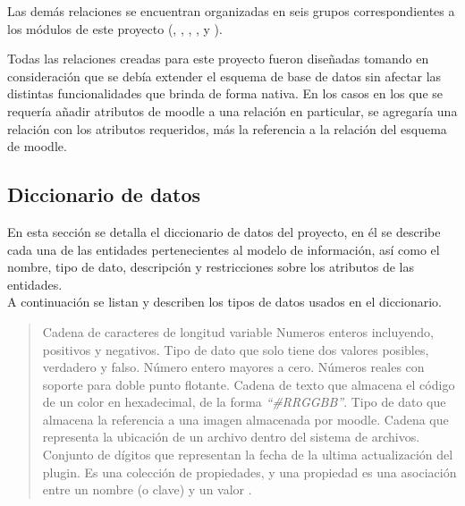  \noindent Las demás relaciones se encuentran organizadas en seis grupos correspondientes
 a los módulos de este proyecto (, , ,
 ,  y ).

 \clearpage

 \noindent Todas las relaciones creadas para este proyecto fueron diseñadas tomando en
 consideración que se debía extender el esquema de base de datos sin afectar las distintas
 funcionalidades que brinda de forma nativa. En los casos en los que se requería añadir
 atributos de moodle a una relación en particular, se agregaría una relación con los atributos
 requeridos, más la referencia a la relación del esquema de moodle.


\clearpage
\subsection{Diccionario de datos}

 En esta sección se detalla el diccionario de datos del proyecto, en él se describe cada una
 de las entidades pertenecientes al modelo de información, así como el nombre, tipo de dato,
 descripción y restricciones sobre los atributos de las entidades.\\

 A continuación se listan y describen los tipos de
 datos usados en el diccionario.

    \begin{quote}
    \begin{bGlosario}
         Cadena de caracteres de longitud variable
                 Numeros enteros incluyendo, positivos y negativos.
         Tipo de dato que solo tiene dos valores posibles,
                                  verdadero y falso.
         Número entero mayores a cero.
           Números reales con soporte para doble punto flotante.
             Cadena de texto que almacena el código de un color en hexadecimal,
                                  de la forma {\it ``\#RRGGBB''}.
            Tipo de dato que almacena la referencia a una imagen almacenada por
                                  moodle.
               Cadena que representa la ubicación de un archivo dentro del sistema
                                  de archivos.
         Conjunto de dígitos que representan la fecha de la ultima
                                  actualización del plugin.
          Es una colección de propiedades, y una propiedad es una
                                  asociación entre un nombre (o clave) y un valor
                                  \cite{ObjectMozilla}.
    \end{bGlosario}
    \end{quote}

